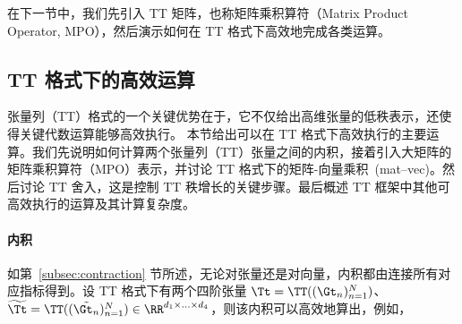 在下一节中，我们先引入 TT 矩阵，也称矩阵乘积算符（Matrix Product Operator, MPO），然后演示如何在 TT 格式下高效地完成各类运算。
\subsection{TT 格式下的高效运算}\label{sec:efficient-operations}
张量列（TT）格式的一个关键优势在于，它不仅给出高维张量的低秩表示，还使得关键代数运算能够高效执行。
本节给出可以在 TT 格式下高效执行的主要运算。我们先说明如何计算两个张量列（TT）张量之间的内积，接着引入大矩阵的矩阵乘积算符（MPO）表示，并讨论 TT 格式下的矩阵-向量乘积~(mat–vec)。然后讨论 TT 舍入，这是控制 TT 秩增长的关键步骤。最后概述 TT 框架中其他可高效执行的运算及其计算复杂度。
\paragraph{内积}
如第~\ref{subsec:contraction} 节所述，无论对张量还是对向量，内积都由连接所有对应指标得到。设 TT 格式下有两个四阶张量 $\Tt=\TT(({\Gt_n})_{n=1}^N)$、$\widetilde{\Tt}=\TT(({\Tilde{\Gt_n}})_{n=1}^N)\in\RR^{d_1\times...\times d_4}$，则该内积可以高效地算出，例如，
